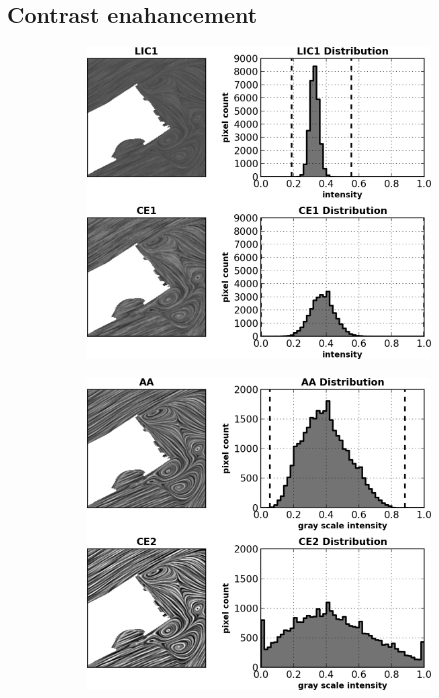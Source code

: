 \documentclass[a4paper,10pt]{article}
\begin{document}
\subsection{Contrast enahancement}

\begin{figure}[ht]
 \centering
\begin{subfigure}{0.48\textwidth}
\includegraphics[width=\textwidth]{./images-data/dia-serial/gray-ce1-curves.png}
\caption{}
\label{fig:gray-ce-curves1}
\end{subfigure}
\hspace{0.15in}
\begin{subfigure}{0.48\textwidth}
\includegraphics[width=\textwidth]{./images-data/dia-serial/gray-ce2-curves.png}
\caption{}
\label{fig:gray-ce-curves2}
\end{subfigure}
\end{figure}
\end{document}
